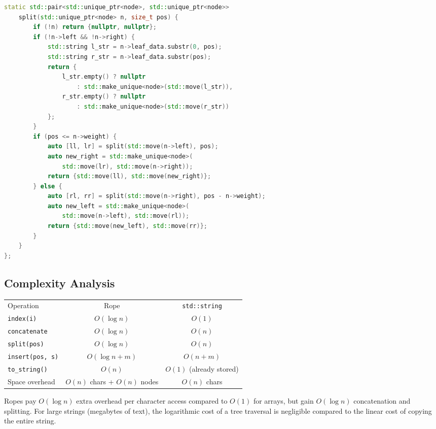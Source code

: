 \begin{lstlisting}[language=C++]
    static std::pair<std::unique_ptr<node>, std::unique_ptr<node>>
    split(std::unique_ptr<node> n, size_t pos) {
        if (!n) return {nullptr, nullptr};
        if (!n->left && !n->right) {
            std::string l_str = n->leaf_data.substr(0, pos);
            std::string r_str = n->leaf_data.substr(pos);
            return {
                l_str.empty() ? nullptr
                    : std::make_unique<node>(std::move(l_str)),
                r_str.empty() ? nullptr
                    : std::make_unique<node>(std::move(r_str))
            };
        }
        if (pos <= n->weight) {
            auto [ll, lr] = split(std::move(n->left), pos);
            auto new_right = std::make_unique<node>(
                std::move(lr), std::move(n->right));
            return {std::move(ll), std::move(new_right)};
        } else {
            auto [rl, rr] = split(std::move(n->right), pos - n->weight);
            auto new_left = std::make_unique<node>(
                std::move(n->left), std::move(rl));
            return {std::move(new_left), std::move(rr)};
        }
    }
};
\end{lstlisting}

\subsection{Complexity Analysis}

\begin{center}
\begin{tabular}{lcc}
\toprule
Operation & Rope & \texttt{std::string} \\
\texttt{index(i)} & $O(\log n)$ & $O(1)$ \\
\texttt{concatenate} & $O(\log n)$ & $O(n)$ \\
\texttt{split(pos)} & $O(\log n)$ & $O(n)$ \\
\texttt{insert(pos, s)} & $O(\log n + m)$ & $O(n + m)$ \\
\texttt{to\_string()} & $O(n)$ & $O(1)$ (already stored) \\
Space overhead & $O(n)$ chars + $O(n)$ nodes & $O(n)$ chars \\

\bottomrule
\end{tabular}
\end{center}

Ropes pay $O(\log n)$ extra overhead per character access compared to $O(1)$ for arrays, but gain $O(\log n)$ concatenation and splitting. For large strings (megabytes of text), the logarithmic cost of a tree traversal is negligible compared to the linear cost of copying the entire string.

